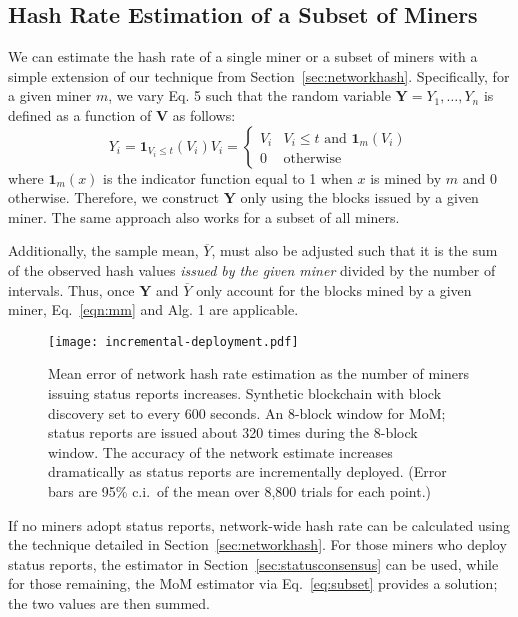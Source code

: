 \documentclass[10pt,sigconf]{acmart}
\newcommand{\para }[1]{\smallskip \noindent {\bf #1}}
\newcommand{\1}{{\em (i)}}
\newcommand{\2}{{\em (ii)}}
\newcommand{\3}{{\em (iii)}}
\newcommand{\4}{{\em (iv)}}
\newcommand{\5}{{\em (v)}}
\begin{document}
\subsection{Hash Rate Estimation of a Subset of Miners}\label{sec:subset-miners}
We can estimate the hash rate of a single miner or a subset of miners with a simple extension of our technique from Section~\ref{sec:networkhash}. Specifically, for a given miner $m$, we
vary Eq. 5 such that the random variable
$\textbf{Y} = Y_1, \ldots, Y_n$ is defined as a function of
$\textbf{V}$ as follows:
\begin{equation}
Y_i = \textbf{1}_{V_i \leq t}(V_i) V_i = \left \{
\begin{array}{lr}
V_i & V_i \leq t \text{ and } \textbf{1}_m (V_i) \\
0 & \text{otherwise}
\end{array}
\right .
\label{eq:subset}
\end{equation}
where $\textbf{1}_m (x)$ is the indicator function equal to 1 when $x$
is mined by $m$ and 0 otherwise. Therefore, we construct
$\textbf{Y}$ only using the blocks issued by a given miner. The same approach also works for a subset of all miners. 

Additionally, the sample
mean, $\overline{Y}$, must also be adjusted such that it is the sum of
the observed hash values \textit{issued by the given miner}
divided by the number of intervals. Thus, once $\textbf{Y}$ and
$\overline{Y}$ only account for the blocks mined by a given miner,
Eq.~\ref{eqn:mm} and Alg. 1 are applicable.



\begin{figure}[t] 
   \centering
   \texttt{[image: incremental-deployment.pdf]} 
   \caption{Mean error of network hash rate estimation as the number of miners 
     issuing status reports increases. Synthetic blockchain with block discovery set to every 600 seconds. An 8-block window for MoM; status reports are issued about 320 times during the 8-block window. The accuracy of the network estimate increases dramatically as status reports are incrementally deployed. (Error bars are 95\% c.i.\ of the mean over 8,800 trials for each point.)}

   \label{fig:deployment}
\end{figure}


\para{Incremental Deployment.} If no miners adopt status
reports, network-wide hash rate can be calculated using the technique
detailed in Section~\ref{sec:networkhash}. For those miners who
deploy status reports, the estimator in
Section~\ref{sec:statusconsensus} can be used, while for those
remaining, the MoM estimator via Eq.~\ref{eq:subset} provides a solution; the two values are then summed.
\end{document}
